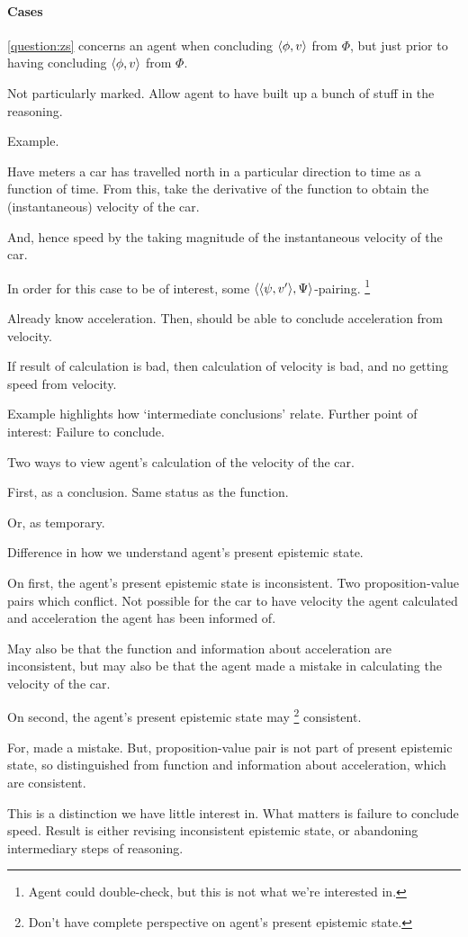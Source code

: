 \paragraph{Cases}

\begin{note}
  \autoref{question:zs} concerns an agent when concluding \(\langle \phi, v \rangle\) from \(\Phi\), but just prior to having concluding \(\langle \phi, v \rangle\) from \(\Phi\).

  Not particularly marked.
  Allow agent to have built up a bunch of stuff in the reasoning.

  Example.

  Have meters a car has travelled north in a particular direction to time as a function of time.
  From this, take the derivative of the function to obtain the (instantaneous) velocity of the car.

  And, hence speed by the taking magnitude of the instantaneous velocity of the car.

  In order for this case to be of interest, some \(\langle \langle \psi, v' \rangle, \Psi \rangle\)-pairing.%
  \footnote{
    Agent could double-check, but this is not what we're interested in.
  }

  Already know acceleration.
  Then, should be able to conclude acceleration from velocity.

  If result of calculation is bad, then calculation of velocity is bad, and no getting speed from velocity.
\end{note}

\begin{note}
  Example highlights how `intermediate conclusions' relate.
  Further point of interest:
  Failure to conclude.

  Two ways to view agent's calculation of the velocity of the car.

  First, as a conclusion.
  Same status as the function.

  Or, as temporary.

  Difference in how we understand agent's present epistemic state.

  On first, the agent's present epistemic state is inconsistent.
  Two proposition-value pairs which conflict.
  Not possible for the car to have velocity the agent calculated and acceleration the agent has been informed of.

  May also be that the function and information about acceleration are inconsistent, but may also be that the agent made a mistake in calculating the velocity of the car.

  On second, the agent's present epistemic state may%
  \footnote{
    Don't have complete perspective on agent's present epistemic state.
  }
  consistent.

  For, made a mistake.
  But, proposition-value pair is not part of present epistemic state, so distinguished from function and information about acceleration, which are consistent.

  This is a distinction we have little interest in.
  What matters is failure to conclude speed.
  Result is either revising inconsistent epistemic state, or abandoning intermediary steps of reasoning.
\end{note}

